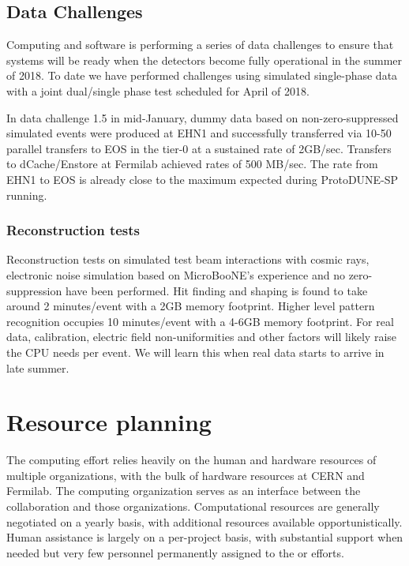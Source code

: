 \subsection{Data Challenges}

Computing and software is performing a series of data challenges to ensure that systems will be ready when the detectors become fully operational in the summer of 2018.  To date we have performed challenges using simulated single-phase data with a joint dual/single phase test scheduled for April of 2018.

In data challenge 1.5 in mid-January, dummy data based on non-zero-suppressed simulated events were produced at EHN1 and successfully transferred via 10-50 parallel transfers to EOS in the tier-0 at a sustained rate of 2GB/sec.    Transfers to dCache/Enstore at Fermilab achieved rates of 500 MB/sec.  
The rate from EHN1 to EOS is already close to the maximum expected during ProtoDUNE-SP running.

\subsubsection{Reconstruction tests}
Reconstruction tests on simulated test beam interactions with cosmic rays, electronic noise simulation based on MicroBooNE's experience and no zero-suppression have been performed. Hit finding and shaping is found to take around 2 minutes/event with a 2GB memory footprint.  Higher level pattern recognition occupies 10 minutes/event with a 4-6GB memory footprint. For real data, calibration, electric field non-uniformities and other factors will likely raise the CPU needs per event. We will learn this when real data starts to arrive in late summer. 


\section{Resource planning}



The   computing effort  relies heavily on the human and hardware resources of  multiple organizations,  with the bulk of hardware resources at CERN and Fermilab.  The    computing organization serves as an interface between the collaboration and those organizations.  Computational resources are generally negotiated on a yearly basis, with additional resources available opportunistically. Human assistance is largely on a per-project  basis, with substantial support when needed but very few personnel permanently assigned to the   or  efforts.

